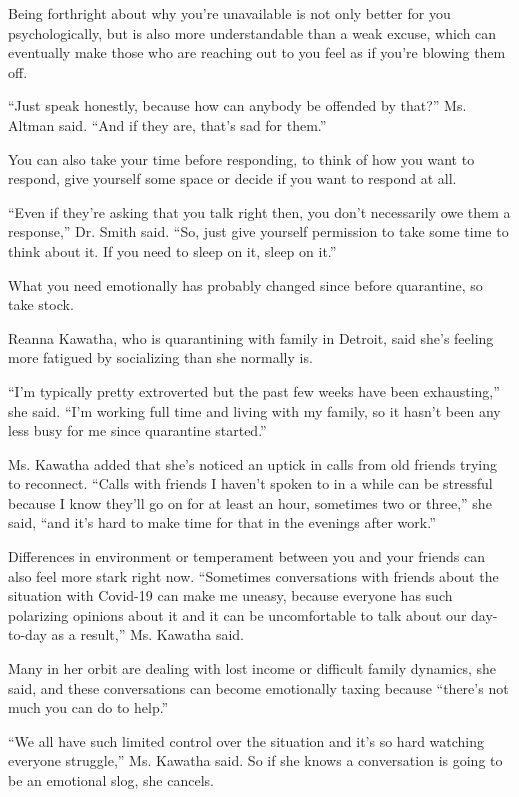 Being forthright about why you're unavailable is not only better for you
psychologically, but is also more understandable than a weak excuse,
which can eventually make those who are reaching out to you feel as if
you're blowing them off.

``Just speak honestly, because how can anybody be offended by that?''
Ms. Altman said. ``And if they are, that's sad for them.''

You can also take your time before responding, to think of how you want
to respond, give yourself some space or decide if you want to respond at
all.

``Even if they're asking that you talk right then, you don't necessarily
owe them a response,'' Dr. Smith said. ``So, just give yourself
permission to take some time to think about it. If you need to sleep on
it, sleep on it.''

What you need emotionally has probably changed since before quarantine,
so take stock.

Reanna Kawatha, who is quarantining with family in Detroit, said she's
feeling more fatigued by socializing than she normally is.

``I'm typically pretty extroverted but the past few weeks have been
exhausting,'' she said. ``I'm working full time and living with my
family, so it hasn't been any less busy for me since quarantine
started.''

Ms. Kawatha added that she's noticed an uptick in calls from old friends
trying to reconnect. ``Calls with friends I haven't spoken to in a while
can be stressful because I know they'll go on for at least an hour,
sometimes two or three,'' she said, ``and it's hard to make time for
that in the evenings after work.''

Differences in environment or temperament between you and your friends
can also feel more stark right now. ``Sometimes conversations with
friends about the situation with Covid-19 can make me uneasy, because
everyone has such polarizing opinions about it and it can be
uncomfortable to talk about our day-to-day as a result,'' Ms. Kawatha
said.

Many in her orbit are dealing with lost income or difficult family
dynamics, she said, and these conversations can become emotionally
taxing because ``there's not much you can do to help.''

``We all have such limited control over the situation and it's so hard
watching everyone struggle,'' Ms. Kawatha said. So if she knows a
conversation is going to be an emotional slog, she cancels.

